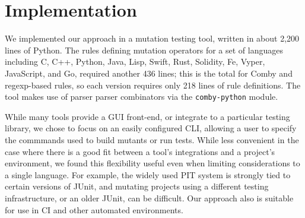 \documentclass[sigconf,review, anonymous]{acmart}
\begin{document}
{\begin{table}[hbtp]
\centering
\caption{Parser Parser Combinator Rule Examples}
\label{tab:crules}
\end{table}

\section{Implementation}
\label{sec:imp}

We implemented our approach in a mutation testing tool, written in
about 2,200 lines of Python.  The rules defining mutation operators
for a set of languages including C, C++, Python, Java, Lisp, Swift,
Rust, Solidity, Fe, Vyper, JavaScript, and Go, required another 436
lines; this is the total for Comby and regexp-based rules, so each
version requires only 218 lines of rule definitions.  The tool makes
use of parser parser combinators via the {\tt comby-python} module.

While many tools provide a GUI front-end, or integrate to a particular
testing library, we chose to focus on an easily configured CLI,
allowing a user to specify the commmands used to build mutants or
run tests.  While less convenient in the case where there is a good
fit between a tool's integrations and a project's environment, we
found this flexibility useful even when limiting considerations to a
single language.  For example, the widely used PIT system is strongly tied to
certain versions of JUnit, and mutating projects using a different
testing infrastructure, or an older JUnit, can be difficult.  Our
approach also is suitable for use in CI and other automated
environments.

}
\end{document}
